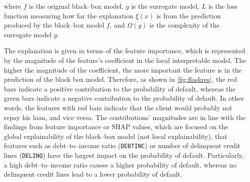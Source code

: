 where $f$ is the original black--box model, $g$ is the surrogate model, $L$ is the loss function measuring how far the explanation $\xi(x)$ is from the prediction produced by the black--box model $f$, and $\Omega(g)$ is the complexity of the surrogate model $g$.


The explanation is given in terms of the feature importance, which is represented by the magnitude of the feature's coefficient in the local interpretable model. The higher the magnitude of the coefficient, the more important the feature is in the prediction of the black box model.
Therefore, as shown in \autoref{fig:flaskres}, the red bars indicate a positive contribution to the probability of default, whereas the green bars indicate a negative contribution to the probability of default. In other words, the features with red bars indicate that the client would probably not repay his loan, and vice versa.
The contributions' magnitudes are in line with the findings from feature importance or SHAP values, which are focused on the global explainability of the black--box model (not local explainability), that features such as debt--to--income ratio (\texttt{DEBTINC}) or number of delinquent credit lines (\texttt{DELINQ}) have the largest impact on the probability of default.
Particularly, a high debt--to--income ratio causes a higher probability of default, whereas no delinquent credit lines lead to a lower probability of default.
